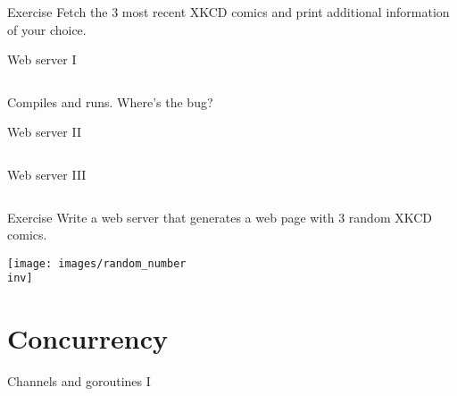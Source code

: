 \documentclass[10pt]{beamer}
\newcommand{\inv}{-inv}
\begin{document}
	
	\begin{frame}[fragile]{Exercise}
		Fetch the 3 most recent XKCD comics and print additional information of your choice.
	\end{frame}
					
	
	\begin{frame}[t,fragile]{Web server I}
		\inputminted{go}{code/11_server.go}
		\pause
		Compiles and runs. Where's the bug?
	\end{frame}
					
	
	\begin{frame}[t,fragile]{Web server II}
		\inputminted{go}{code/12_mutex.go}
	\end{frame}
						
	
	\begin{frame}[t,fragile]{Web server III}
		\inputminted{go}{code/13_atomic.go}
	\end{frame}
	
	
	\begin{frame}[fragile]{Exercise}
		Write a web server that generates a web page with 3 random XKCD comics.\\
		\begin{center}
			\texttt{[image: images/random\_number\\inv]}
		\end{center}
	\end{frame}

	
	\section{Concurrency}
							
	
	\begin{frame}[t,fragile]{Channels and goroutines I}
		\inputminted{go}{code/14_stack.go}
	\end{frame}
								
\end{document}
